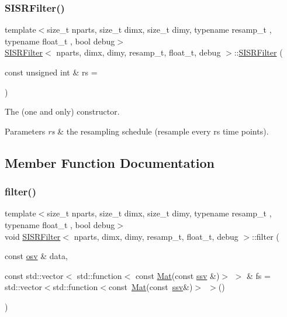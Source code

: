 \subsubsection{\texorpdfstring{S\+I\+S\+R\+Filter()}{SISRFilter()}}
{\footnotesize\ttfamily template$<$size\+\_\+t nparts, size\+\_\+t dimx, size\+\_\+t dimy, typename resamp\+\_\+t , typename float\+\_\+t , bool debug$>$ \\
\hyperlink{classSISRFilter}{S\+I\+S\+R\+Filter}$<$ nparts, dimx, dimy, resamp\+\_\+t, float\+\_\+t, debug $>$\+::\hyperlink{classSISRFilter}{S\+I\+S\+R\+Filter} (\begin{DoxyParamCaption}\item[{const unsigned int \&}]{rs = {} }\end{DoxyParamCaption})}



The (one and only) constructor. 


\begin{DoxyParams}{Parameters}
{\em rs} & the resampling schedule (resample every rs time points). \\
\hline
\end{DoxyParams}


\subsection{Member Function Documentation}
\mbox{\label{classSISRFilter_a40a7033e04472f10511f731074db97a9}} 
\subsubsection{\texorpdfstring{filter()}{filter()}}
{\footnotesize\ttfamily template$<$size\+\_\+t nparts, size\+\_\+t dimx, size\+\_\+t dimy, typename resamp\+\_\+t , typename float\+\_\+t , bool debug$>$ \\
void \hyperlink{classSISRFilter}{S\+I\+S\+R\+Filter}$<$ nparts, dimx, dimy, resamp\+\_\+t, float\+\_\+t, debug $>$\+::filter (\begin{DoxyParamCaption}\item[{const \hyperlink{classSISRFilter_a42325662bf3d057ccc3eaa75fa2f70f9}{osv} \&}]{data,  }\item[{const std\+::vector$<$ std\+::function$<$ const \hyperlink{classSISRFilter_afca4a8c20de84bb2581e500954df0912}{Mat}(const \hyperlink{classSISRFilter_ada0fdfca451ed6a22a8bba48a881819d}{ssv} \&)$>$ $>$ \&}]{fs = {\ttfamily std\+:\+:vector$<$std\+:\+:function$<$const~\hyperlink{classSISRFilter_afca4a8c20de84bb2581e500954df0912}{Mat}(const~\hyperlink{classSISRFilter_ada0fdfca451ed6a22a8bba48a881819d}{ssv}\&)$>$~$>$()} }\end{DoxyParamCaption})}



